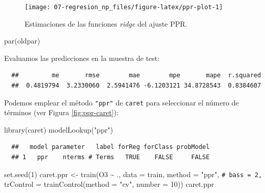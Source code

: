 \documentclass[
]{book}
\newenvironment{Shaded}{\begin{snugshade}}{\end{snugshade}}
\newcommand{\AttributeTok}[1]{\textcolor[rgb]{0.77,0.63,0.00}{#1}}
\newcommand{\CommentTok}[1]{\textcolor[rgb]{0.56,0.35,0.01}{\textit{#1}}}
\newcommand{\DecValTok}[1]{\textcolor[rgb]{0.00,0.00,0.81}{#1}}
\newcommand{\FunctionTok}[1]{\textcolor[rgb]{0.00,0.00,0.00}{#1}}
\newcommand{\NormalTok}[1]{#1}
\newcommand{\OtherTok}[1]{\textcolor[rgb]{0.56,0.35,0.01}{#1}}
\newcommand{\SpecialCharTok}[1]{\textcolor[rgb]{0.00,0.00,0.00}{#1}}
\newcommand{\StringTok}[1]{\textcolor[rgb]{0.31,0.60,0.02}{#1}}
\theoremstyle{break}
\theoremstyle{nonumberplain}
\renewcommand{\CommentTok}[1]{\textcolor[rgb]{0.41,0.41,0.41}{\texttt{#1}}}
\begin{document}
\begin{figure}[!htb]

{\centering \texttt{[image: 07-regresion\_np\_files/figure-latex/ppr-plot-1]} 

}

\caption{Estimaciones de las funciones \emph{ridge} del ajuste PPR.}\label{fig:ppr-plot}
\end{figure}

\begin{Shaded}
\begin{Highlighting}[]
\FunctionTok{par}\NormalTok{(oldpar)}
\end{Highlighting}
\end{Shaded}

Evaluamos las predicciones en la muestra de test:

\begin{Shaded}
\end{Shaded}

\begin{verbatim}
  ##         me       rmse        mae        mpe       mape  r.squared 
  ##  0.4819794  3.2330060  2.5941476 -6.1203121 34.8728543  0.8384607
\end{verbatim}

Podemos emplear el método \texttt{"ppr"} de \texttt{caret} para seleccionar el número de términos (ver Figura \ref{fig:ppr-caret}):



\begin{Shaded}
\begin{Highlighting}[]
\FunctionTok{library}\NormalTok{(caret)}
\FunctionTok{modelLookup}\NormalTok{(}\StringTok{"ppr"}\NormalTok{)}
\end{Highlighting}
\end{Shaded}

\begin{verbatim}
  ##   model parameter   label forReg forClass probModel
  ## 1   ppr    nterms # Terms   TRUE    FALSE     FALSE
\end{verbatim}

\begin{Shaded}
\begin{Highlighting}[]
\FunctionTok{set.seed}\NormalTok{(}\DecValTok{1}\NormalTok{)}
\NormalTok{caret.ppr }\OtherTok{\textless{}{-}} \FunctionTok{train}\NormalTok{(O3 }\SpecialCharTok{\textasciitilde{}}\NormalTok{ ., }\AttributeTok{data =}\NormalTok{ train, }\AttributeTok{method =} \StringTok{"ppr"}\NormalTok{, }\CommentTok{\# bass = 2,}
    \AttributeTok{trControl =} \FunctionTok{trainControl}\NormalTok{(}\AttributeTok{method =} \StringTok{"cv"}\NormalTok{, }\AttributeTok{number =} \DecValTok{10}\NormalTok{))}
\NormalTok{caret.ppr}
\end{Highlighting}
\end{Shaded}
\end{document}
